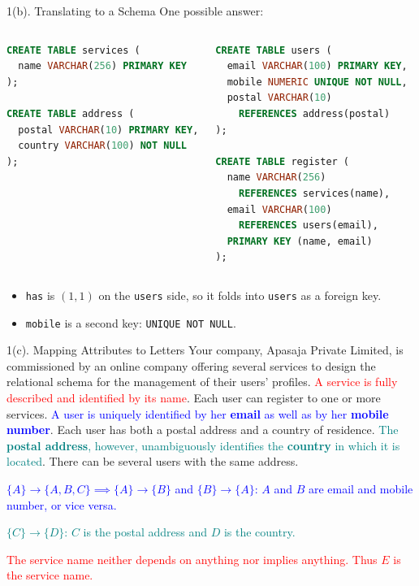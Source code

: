 \documentclass{beamer}
\newcommand\fd[2]{\{#1\} \rightarrow \{#2\}}
\begin{document}
\begin{frame}[fragile]{1(b). Translating to a Schema}
\footnotesize
One possible answer:
\begin{columns}[t,onlytextwidth]
\begin{lstlisting}[language=SQL,numbers=none]
CREATE TABLE services (
  name VARCHAR(256) PRIMARY KEY
);

CREATE TABLE address (
  postal VARCHAR(10) PRIMARY KEY,
  country VARCHAR(100) NOT NULL
);
\end{lstlisting}
\begin{lstlisting}[language=SQL,numbers=none]
CREATE TABLE users (
  email VARCHAR(100) PRIMARY KEY,
  mobile NUMERIC UNIQUE NOT NULL,
  postal VARCHAR(10)
    REFERENCES address(postal)
);

CREATE TABLE register (
  name VARCHAR(256)
    REFERENCES services(name),
  email VARCHAR(100)
    REFERENCES users(email),
  PRIMARY KEY (name, email)
);
\end{lstlisting}
\end{columns}
\medskip
\begin{itemize}
  \item \texttt{has} is $(1,1)$ on the \texttt{users} side, so it folds into \texttt{users} as a foreign key.
  \item \texttt{mobile} is a second key: \texttt{UNIQUE NOT NULL}.
\end{itemize}
\end{frame}

\begin{frame}{1(c). Mapping Attributes to Letters}
\footnotesize
Your company, Apasaja Private Limited, is commissioned by an online company offering several services to design the relational schema for the management of their users' profiles. \textcolor{red}{A service is fully described and identified by its name}. Each user can register to one or more services. \textcolor{blue}{A user is uniquely identified by her \textbf{email} as well as by her \textbf{mobile number}}. Each user has both a postal address and a country of residence. \textcolor{teal}{The \textbf{postal address}, however, unambiguously identifies the \textbf{country} in which it is located}. There can be several users with the same address.
\medskip

\normalsize
\pause
\textcolor{blue}{$\fd{A}{A,B,C} \implies \fd{A}{B}$ and $\fd{B}{A}$: $A$ and $B$ are email and mobile number, or vice versa.}
\medskip

\pause
\textcolor{teal}{$\fd{C}{D}$: $C$ is the postal address and $D$ is the country.}
\medskip

\pause
\textcolor{red}{The service name neither depends on anything nor implies anything. Thus $E$ is the service name.}
\end{frame}
\end{document}
